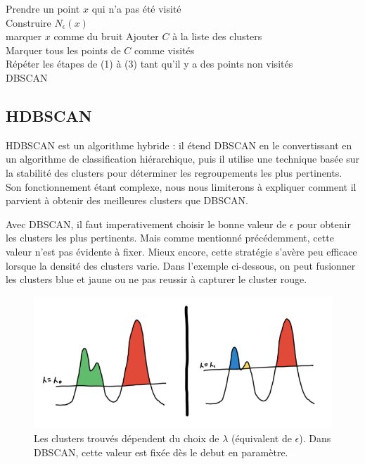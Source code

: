 \documentclass[11pt, openany]{report}
\begin{document}
\begin{algorithm}[H]
Prendre un point $x$ qui n'a pas été visité \\
Construire $N_{\epsilon}\left(x\right)$ \\
 {
   	marquer $x$ comme du bruit
 }
Ajouter $C$ à la liste des clusters \\
Marquer tous les points de $C$ comme visités\\
Répéter les étapes de (1) à (3) tant qu'il y a des points non visités\\
\caption{DBSCAN}
\end{algorithm}

\subsection{HDBSCAN}
HDBSCAN est un algorithme hybride : il étend DBSCAN en le convertissant en un algorithme de classification hiérarchique, puis il utilise une technique basée sur la stabilité des clusters pour déterminer les regroupements les plus pertinents. Son fonctionnement étant complexe, nous nous limiterons à expliquer comment il parvient à obtenir des meilleures clusters que DBSCAN.

Avec DBSCAN, il faut imperativement choisir le bonne valeur de $\epsilon$ pour obtenir les clusters les plus pertinents. Mais comme mentionné précédemment, cette valeur n'est pas évidente à fixer. Mieux encore, cette stratégie s'avère peu efficace lorsque la densité des clusters varie. Dans l'exemple ci-dessous, on peut fusionner les clusters blue et jaune ou ne pas reussir à capturer le cluster rouge.

\begin{figure}[H]
  \centering
  \includegraphics[width=0.6\linewidth]{threshold.png}
  \caption{Les clusters trouvés dépendent du choix de $\lambda$ (équivalent de $\epsilon$). Dans DBSCAN, cette valeur est fixée dès le debut en paramètre.}
\end{figure}
\end{document}
